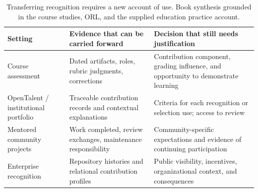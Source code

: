 \begin{table}[htbp]
\caption{Transferring recognition requires a new account of use. Book synthesis grounded in the course studies, ORL, and the supplied education practice account.}
\label{tab:ch7-transfer}
\small\renewcommand{\arraystretch}{1.2}
\begin{tabularx}{\linewidth}{@{}>{\raggedright\arraybackslash}p{27mm}>{\raggedright\arraybackslash}X>{\raggedright\arraybackslash}X@{}}\toprule
Setting & Evidence that can be carried forward & Decision that still needs justification\\\midrule
Course assessment & Dated artifacts, roles, rubric judgments, corrections & Contribution component, grading influence, and opportunity to demonstrate learning\\
OpenTalent / institutional portfolio & Traceable contribution records and contextual explanations & Criteria for each recognition or selection use; access to review\\
Mentored community projects & Work completed, review exchanges, maintenance responsibility & Community-specific expectations and evidence of continuing participation\\
Enterprise recognition & Repository histories and relational contribution profiles & Public visibility, incentives, organizational context, and consequences\\\bottomrule
\end{tabularx}
\end{table}
